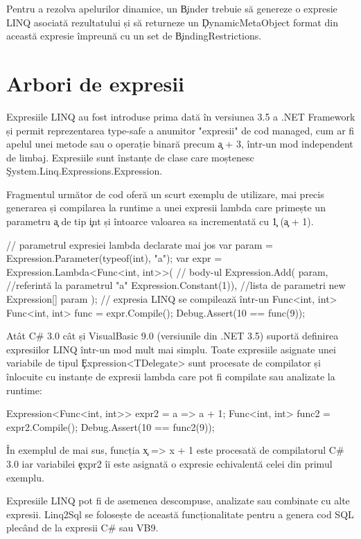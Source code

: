 \documentclass[12pt,a4paper]{memoir}
\begin{document}
Pentru a rezolva apelurilor dinamice, un \c{Binder} trebuie să genereze o expresie LINQ asociată rezultatului și să returneze un \c{DynamicMetaObject} format din această expresie împreună cu un set de \c{BindingRestrictions}.

\section{Arbori de expresii}

Expresiile LINQ au fost introduse prima dată în versiunea 3.5 a .NET Framework\cite{expression_trees_35} și permit reprezentarea type-safe a anumitor "expresii" de cod managed, cum ar fi apelul unei metode sau o operație binară precum \c{a + 3}, într-un mod independent de limbaj. Expresiile sunt înstanțe de clase care moștenesc \c{System.Linq.Expressions.Expression}.

Fragmentul următor de cod oferă un scurt exemplu de utilizare, mai precis generarea și compilarea la runtime a unei expresii lambda care primește un parametru \c{a} de tip \c{int} și întoarce valoarea sa incrementată cu \c{1} (\c{a + 1}).
\begin{code}
// parametrul expresiei lambda declarate mai jos
var param = Expression.Parameter(typeof(int), "a");
var expr =
  Expression.Lambda<Func<int, int>>(
    // body-ul
    Expression.Add(
      param, //referintă la parametrul "a"
      Expression.Constant(1)),
    //lista de parametri
    new Expression[] { param });
// expresia LINQ se compilează într-un Func<int, int>
Func<int, int> func = expr.Compile();
Debug.Assert(10 == func(9));
\end{code}

Atât C\# 3.0 cât și VisualBasic 9.0 (versiunile din .NET 3.5) suportă definirea expresiilor LINQ într-un mod mult mai simplu. Toate expresiile asignate unei variabile de tipul \c{Expression<TDelegate>} sunt procesate de compilator și înlocuite cu instanțe de expresii lambda care pot fi compilate sau analizate la runtime:
\begin{code}
Expression<Func<int, int>> expr2 = a => a + 1;
Func<int, int> func2 = expr2.Compile();
Debug.Assert(10 == func2(9));
\end{code}
În exemplul de mai sus, funcția \c{x => x + 1} este procesată de compilatorul C\# 3.0 iar variabilei \c{expr2} îi este asignată o expresie echivalentă celei din primul exemplu.

Expresiile LINQ pot fi de asemenea descompuse, analizate sau combinate cu alte expresii. Linq2Sql se folosește de această funcționalitate pentru a genera cod SQL plecând de la expresii C\# sau VB9.
\end{document}
